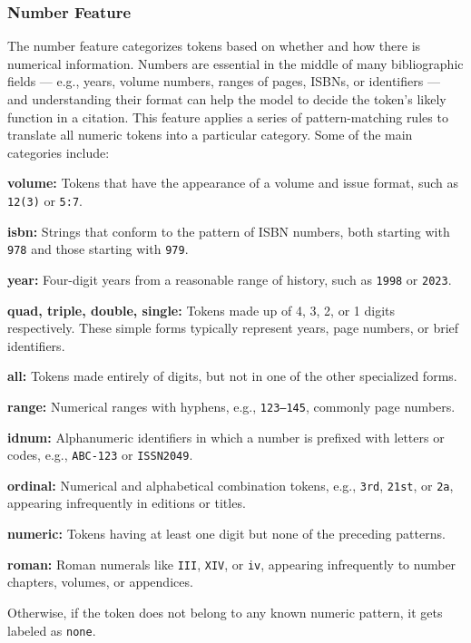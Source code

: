 \subsubsection{Number Feature}
The number feature categorizes tokens based on whether and how there is numerical information. Numbers are essential in the middle of many bibliographic fields — e.g., years, volume numbers, ranges of pages, ISBNs, or identifiers — and understanding their format can help the model to decide the token's likely function in a citation. This feature applies a series of pattern-matching rules to translate all numeric tokens into a particular category. Some of the main categories include:
\begin{compactitem}
\item \textbf{volume:} Tokens that have the appearance of a volume and issue format, such as \texttt{12(3)} or \texttt{5:7}.
\item \textbf{isbn:} Strings that conform to the pattern of ISBN numbers, both starting with \texttt{978} and those starting with \texttt{979}.
\item \textbf{year:} Four-digit years from a reasonable range of history, such as \texttt{1998} or \texttt{2023}.
\item \textbf{quad, triple, double, single:} Tokens made up of 4, 3, 2, or 1 digits respectively. These simple forms typically represent years, page numbers, or brief identifiers.
\item \textbf{all:} Tokens made entirely of digits, but not in one of the other specialized forms.
\item \textbf{range:} Numerical ranges with hyphens, e.g., \texttt{123–145}, commonly page numbers.
\item \textbf{idnum:} Alphanumeric identifiers in which a number is prefixed with letters or codes, e.g., \texttt{ABC-123} or \texttt{ISSN2049}.
\item \textbf{ordinal:} Numerical and alphabetical combination tokens, e.g., \texttt{3rd}, \texttt{21st}, or \texttt{2a}, appearing infrequently in editions or titles.
\item \textbf{numeric:} Tokens having at least one digit but none of the preceding patterns.
\item \textbf{roman:} Roman numerals like \texttt{III}, \texttt{XIV}, or \texttt{iv}, appearing infrequently to number chapters, volumes, or appendices.
\end{compactitem}
Otherwise, if the token does not belong to any known numeric pattern, it gets labeled as \texttt{none}.

